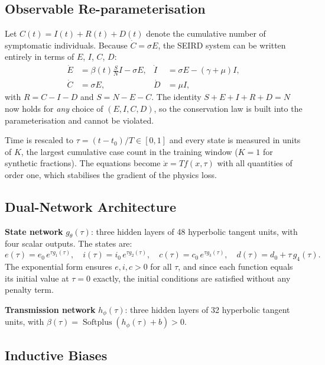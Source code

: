 \documentclass[11pt,a4paper]{article}
\theoremstyle{remark}
\begin{document}
\subsection{Observable Re-parameterisation}

Let $C(t) = I(t) + R(t) + D(t)$ denote the cumulative number of symptomatic
individuals.  Because $\dot C = \sigma E$, the SEIRD system can be written
entirely in terms of $E$, $I$, $C$, $D$:
\begin{align}
    \dot E &= \beta(t)\tfrac{S}{N}I - \sigma E, &
    \dot I &= \sigma E - (\gamma+\mu)I, \label{eq:ei} \\
    \dot C &= \sigma E, &
    \dot D &= \mu I, \label{eq:cd}
\end{align}
with $R = C-I-D$ and $S = N-E-C$.  The identity $S+E+I+R+D=N$ now holds for
\emph{any} choice of $(E,I,C,D)$, so the conservation law is built into the
parameterisation and cannot be violated.

Time is rescaled to $\tau = (t-t_0)/T \in [0,1]$ and every state is measured
in units of $K$, the largest cumulative case count in the training window
($K=1$ for synthetic fractions).  The equations become $\dot x = T f(x,\tau)$
with all quantities of order one, which stabilises the gradient of the
physics loss.

\subsection{Dual-Network Architecture}

\textbf{State network} $g_\theta(\tau)$: three hidden layers of 48 hyperbolic
tangent units, with four scalar outputs.  The states are:
\begin{equation}
    e(\tau) = e_0\,e^{\tau g_1(\tau)}, \quad
    i(\tau) = i_0\,e^{\tau g_2(\tau)}, \quad
    c(\tau) = c_0\,e^{\tau g_3(\tau)}, \quad
    d(\tau) = d_0 + \tau\, g_4(\tau).
    \label{eq:states}
\end{equation}
The exponential form ensures $e,i,c > 0$ for all $\tau$, and since each
function equals its initial value at $\tau=0$ exactly, the initial conditions
are satisfied without any penalty term.

\textbf{Transmission network} $h_\phi(\tau)$: three hidden layers of 32
hyperbolic tangent units, with $\beta(\tau) = \operatorname{Softplus}(h_\phi(\tau)+b) > 0$.

\subsection{Inductive Biases}
\end{document}

